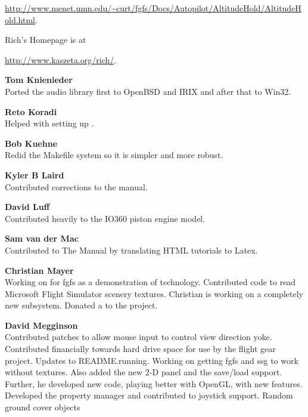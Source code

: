   \href{http://www.menet.umn.edu/~curt/fgfs/Docs/Autopilot/AltitudeHold/AltitudeHold.html}{http://www.menet.umn.edu/\~{}curt/fgfs/Docs/Autopilot/AltitudeHold/AltitudeHold.html}.
  \medskip

\noindent
  Rich's Homepage is at
  \medskip

  \href{http://www.kaszeta.org/rich/}{http://www.kaszeta.org/rich/}.
  \medskip

\noindent \textbf{Tom Knienieder}\\
  Ported the audio library first to OpenBSD and IRIX and after that to Win32.
 \medskip

\noindent \textbf{Reto Koradi}\\
  Helped with setting up .
 \medskip

\noindent \textbf{Bob Kuehne}\\
  Redid the Makefile system so it is simpler and more robust.
 \medskip

\noindent \textbf{Kyler B Laird}\\
 Contributed corrections to the manual.
 \medskip

\noindent \textbf{David Luff}\\
 Contributed heavily to the IO360 piston engine model.
 \medskip

\noindent \textbf{Sam van der Mac}\\
 Contributed to The Manual by translating HTML tutorials to Latex.
 \medskip

\noindent \textbf{Christian Mayer}\\
 Working on  for fgfs as a demonstration of technology.
 Contributed code to read Microsoft Flight Simulator scenery textures. Christian is working on a completely new  subsystem.
 Donated a  to the project.
 \medskip

\noindent \textbf{David Megginson}\\
  Contributed patches to allow mouse input to control view direction yoke.
  Contributed financially towards hard drive space for use by the
  flight gear project. Updates to README.running.
  Working on getting fgfs and ssg to work without textures.
  Also added the new 2-D panel and the save/load support.
  Further, he developed new  code, playing better with OpenGL, with new features.
  Developed the property manager and contributed to joystick support.
  Random ground cover objects
 \medskip

